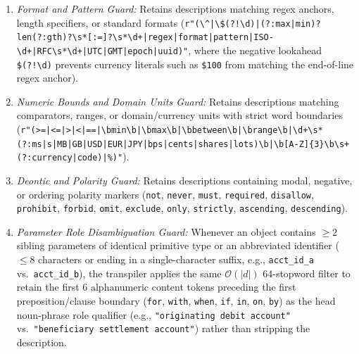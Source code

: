 \documentclass[conference,10pt]{IEEEtran}
\begin{document}
\begin{enumerate}
    \item \textit{Format and Pattern Guard:} Retains descriptions matching regex anchors, length specifiers, or standard formats (\texttt{r"(\textbackslash\string^|\allowbreak\textbackslash\$(?!\textbackslash d)|\allowbreak(?:max|min)?len(?:gth)?\textbackslash s*[:=]?\textbackslash s*\textbackslash d+|\allowbreak regex|\allowbreak format|\allowbreak pattern|\allowbreak ISO-\textbackslash d+|\allowbreak RFC\textbackslash s*\textbackslash d+|\allowbreak UTC|\allowbreak GMT|\allowbreak epoch|\allowbreak uuid)"}, where the negative lookahead \texttt{\$(?!\textbackslash d)} prevents currency literals such as \texttt{\$100} from matching the end-of-line regex anchor).
    \item \textit{Numeric Bounds and Domain Units Guard:} Retains descriptions matching comparators, ranges, or domain/currency units with strict word boundaries (\texttt{r"(>=|\allowbreak<=|\allowbreak>|\allowbreak<|\allowbreak==|\allowbreak\textbackslash bmin\textbackslash b|\allowbreak\textbackslash bmax\textbackslash b|\allowbreak\textbackslash bbetween\textbackslash b|\allowbreak\textbackslash brange\textbackslash b|\allowbreak\textbackslash d+\textbackslash s*(?:ms|\allowbreak s|\allowbreak MB|\allowbreak GB|\allowbreak USD|\allowbreak EUR|\allowbreak JPY|\allowbreak bps|\allowbreak cents|\allowbreak shares|\allowbreak lots)\textbackslash b|\allowbreak\textbackslash b[A-Z]\{3\}\textbackslash b\textbackslash s+(?:currency|\allowbreak code)|\%)"}).
    \item \textit{Deontic and Polarity Guard:} Retains descriptions containing modal, negative, or ordering polarity markers (\texttt{not}, \texttt{never}, \texttt{must}, \texttt{required}, \texttt{disallow}, \texttt{prohibit}, \texttt{forbid}, \texttt{omit}, \texttt{exclude}, \texttt{only}, \texttt{strictly}, \texttt{ascending}, \texttt{descending}).
    \item \textit{Parameter Role Disambiguation Guard:} Whenever an object contains $\ge 2$ sibling parameters of identical primitive type or an abbreviated identifier ($\le 8$ characters or ending in a single-character suffix, e.g., \texttt{acct\_id\_a} vs.\ \texttt{acct\_id\_b}), the transpiler applies the same $\mathcal{O}(|d|)$ 64-stopword filter to retain the first 6 alphanumeric content tokens preceding the first preposition/clause boundary (\texttt{for}, \texttt{with}, \texttt{when}, \texttt{if}, \texttt{in}, \texttt{on}, \texttt{by}) as the head noun-phrase role qualifier (e.g., \texttt{"originating debit account"} vs.\ \texttt{"beneficiary settlement account"}) rather than stripping the description.
\end{enumerate}
\end{document}
